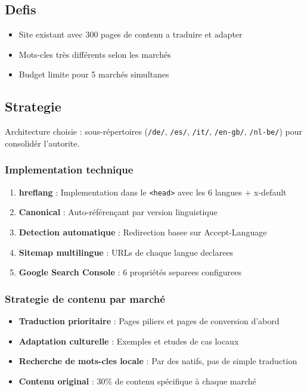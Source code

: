 \subsection{Defis}
\begin{itemize}
    \item Site existant avec 300 pages de contenu a traduire et adapter
    \item Mots-cles très différents selon les marchés
    \item Budget limite pour 5 marchés simultanes
\end{itemize}

\subsection{Strategie}

Architecture choisie : sous-répertoires (\texttt{/de/}, \texttt{/es/}, \texttt{/it/}, \texttt{/en-gb/}, \texttt{/nl-be/}) pour consolidér l'autorite.

\subsubsection{Implementation technique}
\begin{enumerate}
    \item \textbf{hreflang} : Implementation dans le \texttt{<head>} avec les 6 langues + x-default
    \item \textbf{Canonical} : Auto-référençant par version linguistique
    \item \textbf{Detection automatique} : Redirection basee sur Accept-Language
    \item \textbf{Sitemap multilingue} : URLs de chaque langue declarees
    \item \textbf{Google Search Console} : 6 propriétés separees configurees
\end{enumerate}

\subsubsection{Strategie de contenu par marché}
\begin{itemize}
    \item \textbf{Traduction prioritaire} : Pages piliers et pages de conversion d'abord
    \item \textbf{Adaptation culturelle} : Exemples et etudes de cas locaux
    \item \textbf{Recherche de mots-cles locale} : Par des natifs, pas de simple traduction
    \item \textbf{Contenu original} : 30\% de contenu spécifique à chaque marché
\end{itemize}

